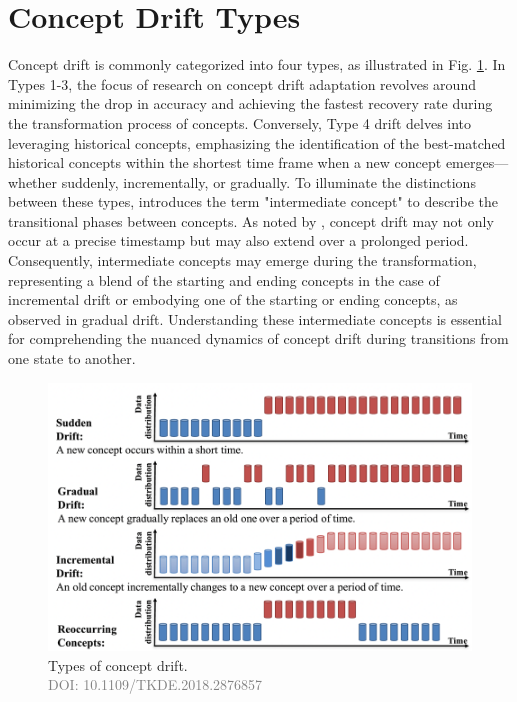 \section{Concept Drift Types}
\label{sec:background_concept_drift_types}
Concept drift is commonly categorized into four types, as illustrated in Fig. \ref{fig:concept-drift-types}. In Types 1-3, the focus of research on concept drift adaptation revolves around minimizing the drop in accuracy and achieving the fastest recovery rate during the transformation process of concepts. Conversely, Type 4 drift delves into leveraging historical concepts, emphasizing the identification of the best-matched historical concepts within the shortest time frame when a new concept emerges—whether suddenly, incrementally, or gradually. To illuminate the distinctions between these types, \cite{losing2016knn} introduces the term "intermediate concept" to describe the transitional phases between concepts. As noted by \cite{liu2018making}, concept drift may not only occur at a precise timestamp but may also extend over a prolonged period. Consequently, intermediate concepts may emerge during the transformation, representing a blend of the starting and ending concepts in the case of incremental drift or embodying one of the starting or ending concepts, as observed in gradual drift. Understanding these intermediate concepts is essential for comprehending  the nuanced dynamics of concept drift during transitions from one state to another.
 
\begin{figure}[!ht]
    \centering
    \includegraphics[width=1.0\textwidth]{2_Background/figures/concept_drift_types.png}
    \caption{Types of concept drift. \\ \textcolor{gray}{\fontsize{10}{0}\selectfont DOI: 10.1109/TKDE.2018.2876857}}
    \label{fig:concept-drift-types}
\end{figure}

